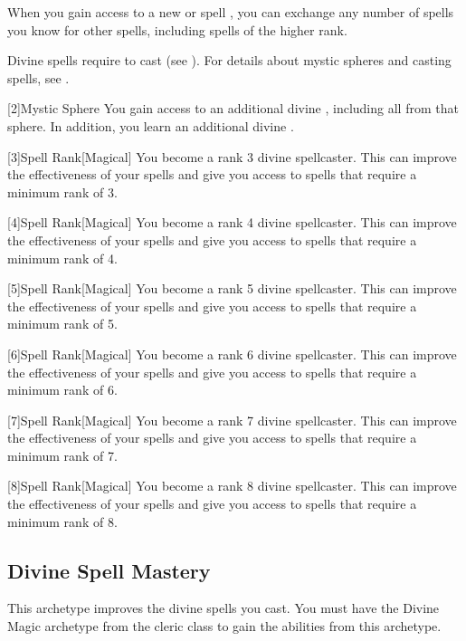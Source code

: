         When you gain access to a new  or spell ,
            you can exchange any number of spells you know for other spells,
            including spells of the higher rank.

        Divine spells require  to cast (see ).
        For details about mystic spheres and casting spells, see .

        [2]{Mystic Sphere} You gain access to an additional divine , including all  from that sphere.
        In addition, you learn an additional divine .

        [3]{Spell Rank}[Magical] You become a rank 3 divine spellcaster.
        This can improve the effectiveness of your spells and give you access to spells that require a minimum rank of 3.

        [4]{Spell Rank}[Magical] You become a rank 4 divine spellcaster.
        This can improve the effectiveness of your spells and give you access to spells that require a minimum rank of 4.

        [5]{Spell Rank}[Magical] You become a rank 5 divine spellcaster.
        This can improve the effectiveness of your spells and give you access to spells that require a minimum rank of 5.

        [6]{Spell Rank}[Magical] You become a rank 6 divine spellcaster.
        This can improve the effectiveness of your spells and give you access to spells that require a minimum rank of 6.

        [7]{Spell Rank}[Magical] You become a rank 7 divine spellcaster.
        This can improve the effectiveness of your spells and give you access to spells that require a minimum rank of 7.

        [8]{Spell Rank}[Magical] You become a rank 8 divine spellcaster.
        This can improve the effectiveness of your spells and give you access to spells that require a minimum rank of 8.

    \subsection{Divine Spell Mastery}
        This archetype improves the divine spells you cast.
        You must have the Divine Magic archetype from the cleric class to gain the abilities from this archetype.

